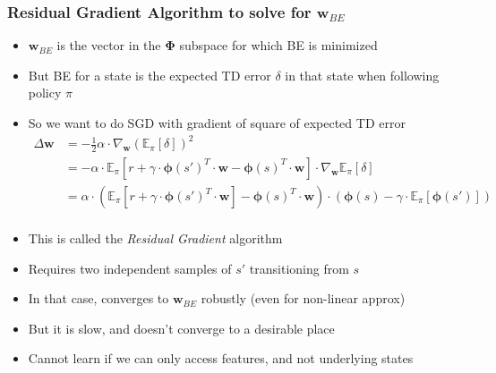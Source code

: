 \documentclass[handout]{beamer}
\newcommand{\bphi}{\bm{\Phi}}
\newcommand{\bw}{\bm{w}}
\begin{document}
\begin{frame}
\frametitle{Residual Gradient Algorithm to solve for $\bm{w}_{BE}$}
\pause
\begin{itemize}[<+->]
\item $\bm{w}_{BE}$ is the vector in the $\bphi$ subspace for which BE is minimized
\item But BE for a state is the expected TD error $\delta$ in that state when following policy $\pi$
\item So we want to do SGD with gradient of square of expected TD error
\begin{align*}
\Delta \bw & = - \frac{1}{2} \alpha \cdot \nabla_{\bw} (\mathbb{E}_{\pi}[\delta])^2\\
& = - \alpha \cdot \mathbb{E}_{\pi}[r + \gamma \cdot \bm{\phi}(s')^T \cdot \bw - \bm{\phi}(s)^T \cdot \bw] \cdot \nabla_{\bw} \mathbb{E}_{\pi}[\delta]\\
& = \alpha \cdot (\mathbb{E}_{\pi}[r + \gamma \cdot \bm{\phi}(s')^T \cdot \bw] - \bm{\phi}(s)^T \cdot \bw) \cdot (\bm{\phi}(s) - \gamma \cdot \mathbb{E}_{\pi}[\bm{\phi}(s')])\\
\end{align*}
\item  This is called the {\em Residual Gradient} algorithm
\item Requires two independent samples of $s'$ transitioning from $s$
\item In that case, converges to $\bm{w}_{BE}$ robustly (even for non-linear approx)
\item But it is slow, and doesn't converge to a desirable place
\item Cannot learn if we can only access features, and not underlying states
\end{itemize}
\end{frame}
\end{document}
